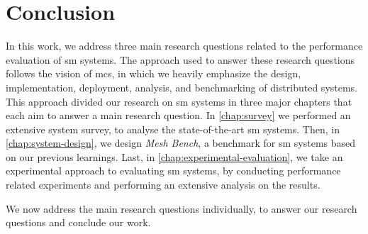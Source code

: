 \section{Conclusion}
\label{sec:conclusion:conclusion}

In this work, we address three main research questions related to the performance evaluation of \gls{sm} systems. The approach used to answer these research questions follows the vision of \gls{mcs}, in which we heavily emphasize the design, implementation, deployment, analysis, and benchmarking of distributed systems. This approach divided our research on \gls{sm} systems in three major chapters that each aim to answer a main research question. In \cref{chap:survey} we performed an extensive system survey, to analyse the state-of-the-art \gls{sm} systems. Then, in  \cref{chap:system-design}, we design \textit{Mesh Bench}, a benchmark for \gls{sm} systems based on our previous learnings. Last, in \cref{chap:experimental-evaluation}, we take an experimental approach to evaluating \gls{sm} systems, by conducting performance related experiments and performing an extensive analysis on the results.

We now address the main research questions individually, to answer our research questions and conclude our work.


